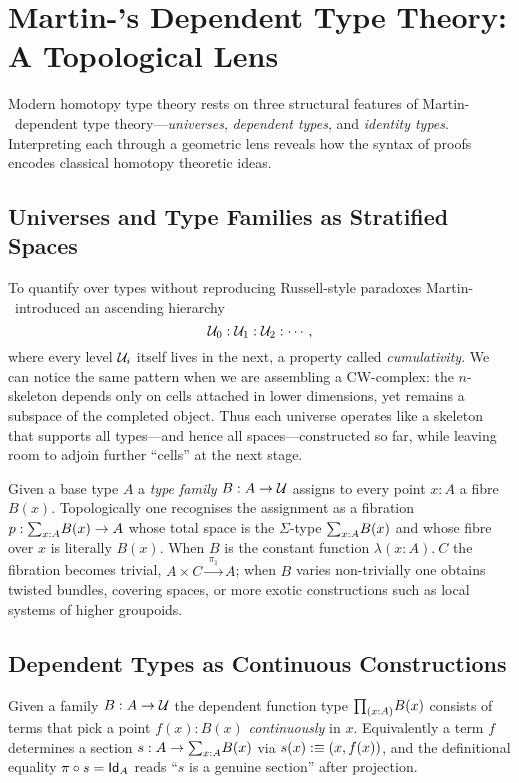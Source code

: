 \section{Martin-\Lof's Dependent Type Theory: A Topological Lens}\label{sec:mltt}

Modern homotopy type theory rests on three structural features of
Martin-\Lof\ dependent type theory—\emph{universes},
\emph{dependent types}, and \emph{identity types}.  Interpreting each
through a geometric lens reveals how the syntax of proofs encodes
classical homotopy theoretic ideas.

\subsection{Universes and Type Families as Stratified Spaces}
To quantify over types without reproducing Russell-style paradoxes
Martin-\Lof\ introduced an ascending hierarchy
\[
    \mathcal{U}_{0} : \mathcal{U}_{1} : \mathcal{U}_{2} : \cdots,
\]
where every level \(\mathcal{U}_{i}\) itself lives in the next, a property
called \emph{cumulativity}.
We can notice the same pattern when we are assembling a CW-complex:
the \(n\)-skeleton depends only on cells attached in lower dimensions,
yet remains a subspace of the completed object.
Thus each universe operates like a skeleton that supports all types—and hence all spaces—constructed so far,
while leaving room to adjoin further ``cells'' at the next stage.

Given a base type \(A\) a \emph{type family} \(B:A\to\mathcal{U}\) assigns to
every point \(x:A\) a fibre \(B(x)\).  Topologically one recognises
the assignment as a fibration \(p:\textstyle\mathbf{\sum}_{x:A}B(x)\to A\) whose
total space is the \(\Sigma\)-type \(\textstyle\mathbf{\sum}_{x:A}B(x)\) and whose fibre
over \(x\) is literally \(B(x)\).  When \(B\) is the constant function
\(\lambda(x:A).~C\) the fibration becomes trivial,
\(A\times C\xrightarrow{\;\pi_{1}\;}A\); when \(B\) varies non-trivially
one obtains twisted bundles, covering spaces, or more exotic
constructions such as local systems of higher groupoids.

\subsection{Dependent Types as Continuous Constructions}
\begin{definition}\label{def:dep-func-type}
    Given a family \(B:A\to\mathcal{U}\) the dependent function
    type \(\textstyle\mathbf{\prod}_{(x:A)}B(x)\) consists of terms that pick a point
    \(f(x):B(x)\) \emph{continuously} in \(x\).  Equivalently a term
    \(f\) determines a section \(s:A\to\textstyle\mathbf{\sum}_{x:A}B(x)\) via
    \(s(x):\equiv(x,f(x))\), and the definitional equality
    \(\pi\circ s=\textsf{Id}_{A}\) reads ``\(s\) is a genuine section'' after
    projection.
\end{definition}

